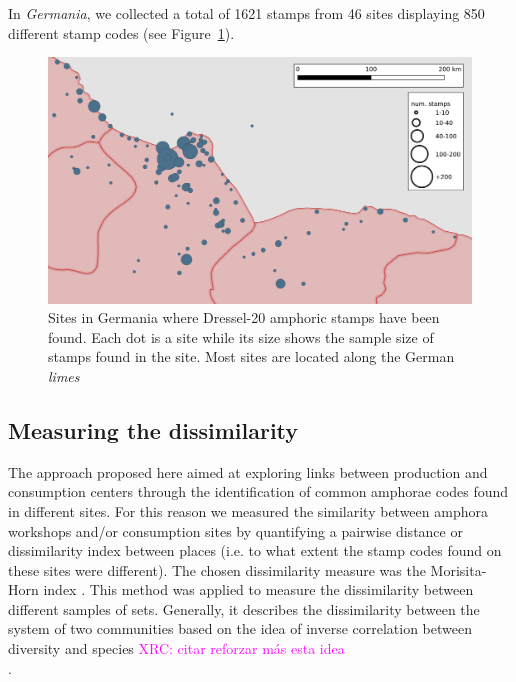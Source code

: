 \documentclass[review]{elsarticle}
\newcommand{\memo}[2]{\textcolor{#1}{#2}}
\newcommand{\xavi}[1]{\memo{magenta}{XRC: #1\\}}
\begin{document}

In \textit{Germania}, we collected a total of 1621 stamps from 46 sites displaying 850 different stamp codes (see Figure~\ref{germania}). 

 
\begin{figure}[htp]
	\centering
\includegraphics[width=\linewidth]{figs/germania}
\caption{Sites in Germania where Dressel-20 amphoric stamps have been found. Each dot is a site while its size shows the sample size of stamps found in the site. Most sites are located along the German \textit{limes}}
\label{germania}
\end{figure}


\subsection{Measuring the dissimilarity}



The approach proposed here aimed at exploring links between production and consumption centers through the identification of common amphorae codes found in different sites. For this reason we measured the similarity between amphora workshops and/or consumption sites by quantifying a pairwise distance or dissimilarity index between places (i.e. to what extent the stamp codes found on these sites were different). The chosen dissimilarity measure was the Morisita-Horn index \citep{morisita_measuring_1959, horn_measurement_1966}. This method was applied to measure the dissimilarity between different samples of sets. Generally, it describes the dissimilarity between the system of two communities based on the idea of inverse correlation between diversity and species \citep{magurran_why_1988}\xavi{citar reforzar más esta idea}.
\end{document}
